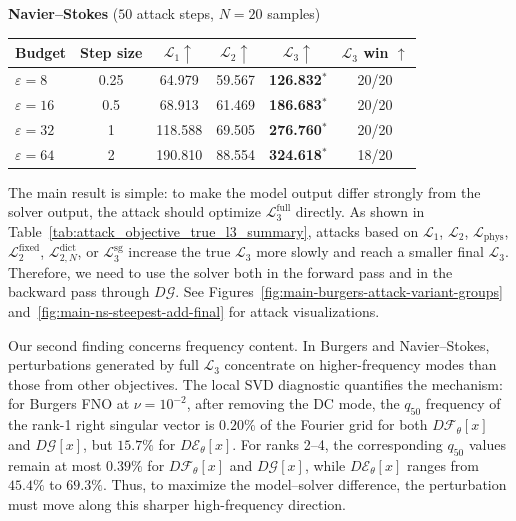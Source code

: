 \documentclass[letterpaper]{article} %
\newcommand{\tabref}[1]{Table~\ref{#1}}
\begin{document}
\begin{table}[t]
\vspace{0.1em}
\setlength{\tabcolsep}{1.1pt}
\textbf{Navier--Stokes} (\(50\) attack steps, \(N=20\) samples)\\[0.15em]
\begin{tabular}{@{}lccccc@{}}
\toprule
Budget & Step size & \(\mathcal L_1 \uparrow\) & \(\mathcal L_2 \uparrow\) &
\(\boldsymbol{\mathcal L}_3 \uparrow\) & \(\mathcal L_3\) win \(\uparrow\) \\
\midrule
\(\varepsilon=8\) & 0.25 & 64.979 & 59.567 & \textbf{126.832}\(^{*}\) & 20/20 \\
\(\varepsilon=16\) & 0.5 & 68.913 & 61.469 & \textbf{186.683}\(^{*}\) & 20/20 \\
\(\varepsilon=32\) & 1 & 118.588 & 69.505 & \textbf{276.760}\(^{*}\) & 20/20 \\
\(\varepsilon=64\) & 2 & 190.810 & 88.554 & \textbf{324.618}\(^{*}\) & 18/20 \\
\bottomrule
\end{tabular}
\end{table}

The main result is simple: to make the model output differ strongly from the
solver output, the attack should optimize $\mathcal{L}^{\mathrm{full}}_3$
directly. As shown in \tabref{tab:attack_objective_true_l3_summary}, attacks based on
$\mathcal{L}_1$, $\mathcal{L}_2$, $\mathcal{L}_{\mathrm{phys}}$,
$\mathcal{L}^{\mathrm{fixed}}_2$, $\mathcal{L}^{\mathrm{dict}}_{2,N}$, or
$\mathcal{L}^{\mathrm{sg}}_3$ increase the true $\mathcal{L}_3$ more
slowly and reach a smaller final $\mathcal{L}_3$. Therefore, we need to use the
solver both in the forward pass and in the backward pass through
$D\mathcal{G}$. See Figures~\ref{fig:main-burgers-attack-variant-groups}
and~\ref{fig:main-ns-steepest-add-final} for attack visualizations.

Our second finding concerns frequency content. In Burgers and Navier--Stokes,
perturbations generated by full $\mathcal{L}_3$ concentrate on higher-frequency
modes than those from other objectives. The local SVD diagnostic quantifies the
mechanism: for Burgers FNO at \(\nu=10^{-2}\), after removing the DC mode, the
\(q_{50}\) frequency of the rank-1 right singular vector is \(0.20\%\) of the
Fourier grid for both \(D\mathcal{F}_\theta[x]\) and \(D\mathcal{G}[x]\), but
\(15.7\%\) for \(D\mathcal{E}_\theta[x]\). For ranks 2--4, the corresponding
\(q_{50}\) values remain at most \(0.39\%\) for \(D\mathcal{F}_\theta[x]\) and
\(D\mathcal{G}[x]\), while \(D\mathcal{E}_\theta[x]\) ranges from \(45.4\%\) to
\(69.3\%\).
Thus, to maximize the model--solver difference, the perturbation must move
along this sharper high-frequency direction.
\end{document}
